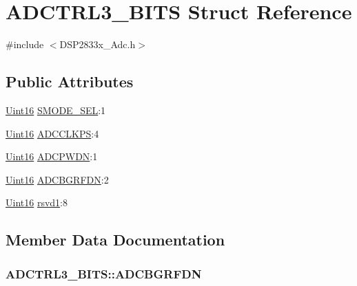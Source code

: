 \hypertarget{struct_a_d_c_t_r_l3___b_i_t_s}{}\section{A\+D\+C\+T\+R\+L3\+\_\+\+B\+I\+T\+S Struct Reference}
\label{struct_a_d_c_t_r_l3___b_i_t_s}


{\ttfamily \#include $<$D\+S\+P2833x\+\_\+\+Adc.\+h$>$}

\subsection*{Public Attributes}
\begin{DoxyCompactItemize}
\item 
\hyperlink{_d_s_p2833x___device_8h_a59a9f6be4562c327cbfb4f7e8e18f08b}{Uint16} \hyperlink{struct_a_d_c_t_r_l3___b_i_t_s_a899955fce9492d0eae5592b8c253bcac}{S\+M\+O\+D\+E\+\_\+\+S\+E\+L}\+:1
\item 
\hyperlink{_d_s_p2833x___device_8h_a59a9f6be4562c327cbfb4f7e8e18f08b}{Uint16} \hyperlink{struct_a_d_c_t_r_l3___b_i_t_s_a101b40b8eb1c2f225ade8410befdb79c}{A\+D\+C\+C\+L\+K\+P\+S}\+:4
\item 
\hyperlink{_d_s_p2833x___device_8h_a59a9f6be4562c327cbfb4f7e8e18f08b}{Uint16} \hyperlink{struct_a_d_c_t_r_l3___b_i_t_s_a63e48dbc08f2cc7951825dac9686e67c}{A\+D\+C\+P\+W\+D\+N}\+:1
\item 
\hyperlink{_d_s_p2833x___device_8h_a59a9f6be4562c327cbfb4f7e8e18f08b}{Uint16} \hyperlink{struct_a_d_c_t_r_l3___b_i_t_s_a5d1aa012da7948bc81e5df51fa430882}{A\+D\+C\+B\+G\+R\+F\+D\+N}\+:2
\item 
\hyperlink{_d_s_p2833x___device_8h_a59a9f6be4562c327cbfb4f7e8e18f08b}{Uint16} \hyperlink{struct_a_d_c_t_r_l3___b_i_t_s_a3fbabc9eec1f460823df0efa8b79833c}{rsvd1}\+:8
\end{DoxyCompactItemize}


\subsection{Member Data Documentation}
\hypertarget{struct_a_d_c_t_r_l3___b_i_t_s_a5d1aa012da7948bc81e5df51fa430882}{}
\subsubsection[{A\+D\+C\+B\+G\+R\+F\+D\+N}]{ A\+D\+C\+T\+R\+L3\+\_\+\+B\+I\+T\+S\+::\+A\+D\+C\+B\+G\+R\+F\+D\+N}\label{struct_a_d_c_t_r_l3___b_i_t_s_a5d1aa012da7948bc81e5df51fa430882}
\hypertarget{struct_a_d_c_t_r_l3___b_i_t_s_a101b40b8eb1c2f225ade8410befdb79c}{}
